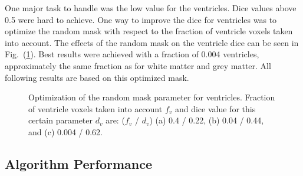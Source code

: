 \documentclass[journal]{IEEEtran}
\begin{document}
One major task to handle was the low value for the ventricles. Dice values above 0.5 were hard to achieve. One way to improve the dice for ventricles was to optimize the random mask with respect to the fraction of ventricle voxels taken into account. The effects of the random mask on the ventricle dice can be seen in Fig.~(\ref{f.random_mask}). Best results were achieved with a fraction of 0.004 ventricles, approximately the same fraction as for white matter and grey matter. All following results are based on this optimized mask.
\begin{figure}[h!]
	\centering
	\hfill
	\hfill
	\caption{Optimization of the random mask parameter for ventricles. Fraction of ventricle voxels taken into account $f_v$ and dice value for this certain parameter $d_v$ are: ($f_v$ / $d_v$) (a) 0.4 / 0.22, (b) 0.04 / 0.44, and (c) 0.004 / 0.62.}
	\label{f.random_mask}
\end{figure}


\subsection{Algorithm Performance}
\end{document}
